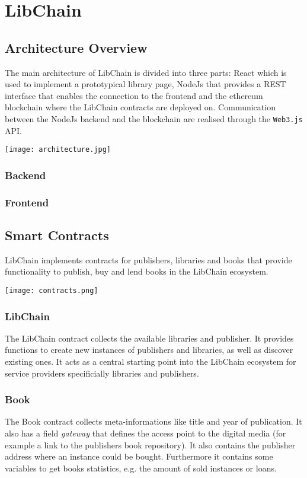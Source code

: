 \chapter{LibChain}

\section{Architecture Overview}
The main architecture of LibChain is divided into three parts: React which is used to implement a prototypical library page, NodeJs that provides a REST interface that enables the connection to the frontend and the ethereum blockchain where the LibChain contracts are deployed on. Communication between the NodeJs backend and the blockchain are realised through the \texttt{Web3.js} API.

\vspace{0.3cm}
\texttt{[image: architecture.jpg]}
\subsection{Backend}


\subsection{Frontend}


\section{Smart Contracts}
LibChain implements contracts for publishers, libraries and books that provide functionality to publish, buy and lend books in the LibChain ecosystem.

\vspace{0.3cm}
\texttt{[image: contracts.png]}

\subsection{LibChain}
The LibChain contract collects the available libraries and publisher. It provides functions to create new instances of publishers and libraries, as well as discover existing ones. It acts as a central starting point into the LibChain ecosystem for service providers specificially libraries and publishers.

\subsection{Book}
The Book contract collects meta-informations like title and year of publication. It also has a field \textit{gateway} that defines the access point to the digital media (for example a link to the publishers book repository). It also contains the publisher address where an instance could be bought. Furthermore it contains some variables to get books statistics, e.g. the amount of sold instances or loans.


